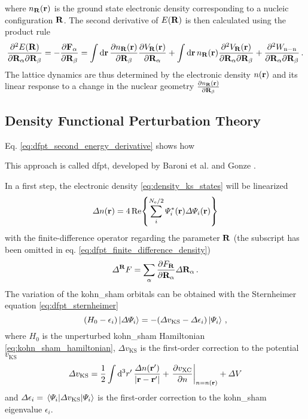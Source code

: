 \documentclass[main.tex]{subfiles}
\begin{document}
where \(n_{\vb{R}} (\vb{r})\) is the ground state electronic density corresponding to a nucleic configuration \(\vb{R}\).
The second derivative of \(E(\vb{R})\) is then calculated using the product rule
\begin{equation}\label{eq:dfpt_second_energy_derivative}
    \pdv{E(\vb{R})}{\vb{R}_{\alpha}}{\vb{R}_{\beta}} = - \pdv{\vb{F}_{\alpha}}{\vb{R}_{\beta}} = \int \dd{\vb{r}} \pdv{n_{\vb{R}} (\vb{r})}{\vb{R}_{\beta}}  \pdv{V_{\vb{R}} (\vb{r})}{\vb{R}_{\alpha}}
    + \int \dd{\vb{r}} n_{\vb{R}} (\vb{r}) \pdv{V_{\vb{R}} (\vb{r})}{\vb{R}_{\alpha}}{\vb{R}_{\beta}}
    + \pdv{W_{\mathrm{n-n}}}{\vb{R}_{\alpha}}{\vb{R}_{\beta}} \,.
\end{equation}
The lattice dynamics are thus determined by the electronic density \(n(\vb{r})\) and its linear response to a change in the nuclear geometry \(\pdv{n_{\vb{R}} (\vb{r})}{\vb{R}_{\beta}}\)

\subsection{Density Functional Perturbation Theory}

Eq. \ref{eq:dfpt_second_energy_derivative} shows how

This approach is called \acrfull{dfpt}, developed by Baroni et al. \cite{baroni_greens-function_1987} and Gonze \cite{gonze_adiabatic_1995}.

In a first step, the electronic density \ref{eq:density_ks_states} will be linearized
\begin{equation}\label{eq:dfpt_finite_difference_density}
    \Delta n(\vb{r}) = 4 \Re{\sum_i^{N_{\mathrm{e}} / 2} \Psi_i^* (\vb{r}) \Delta \Psi_i (\vb{r})}
\end{equation}
with the finite-difference operator regarding the parameter \(\vb{R}\) (the subscript has been omitted in eq. \ref{eq:dfpt_finite_difference_density})
\begin{equation}
    \Delta^{\vb{R}} F = \sum_{\alpha} \pdv{F_{\vb{R}}}{\vb{R}_{\alpha}} \Delta \vb{R}_{\alpha}\,.
\end{equation}
The variation of the \acrshort{kohn_sham} orbitals can be obtained with the Sternheimer equation \ref{eq:dfpt_sternheimer}
\begin{equation}
    (H_0 - \epsilon_i) \ket{\Delta \Psi_i} = - (\Delta v_{\mathrm{KS}} - \Delta \epsilon_i) \ket{\Psi_i}\,,
\end{equation}
where \(H_0\) is the unperturbed \acrshort{kohn_sham} Hamiltonian \ref{eq:kohn_sham_hamiltonian}, \(\Delta v_{\mathrm{KS}}\) is the first-order correction to the potential \(v_{\mathrm{KS}}\)
\begin{equation}
    \Delta v_{\mathrm{KS}} = \frac{1}{2} \int \dd[3]{r^{\prime}} \frac{\Delta n(\vb{r}^{\prime})}{\vert \vb{r} - \vb{r}^{\prime} \vert} + \left. \pdv{v_{\mathrm{XC}}}{n} \right\vert_{n = n(\vb{r})} + \Delta V
\end{equation}
and \(\Delta \epsilon_i = \expval{\Delta v_{\mathrm{KS}}}{\Psi_i}\) is the first-order correction to the \acrshort{kohn_sham} eigenvalue \(\epsilon_i\).

\end{document}
